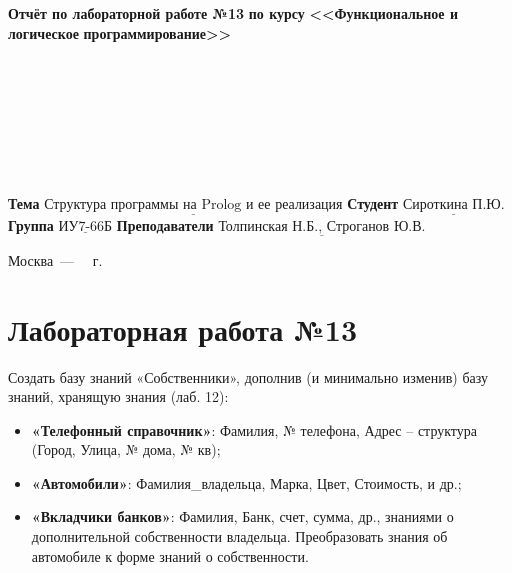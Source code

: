 \documentclass[12pt,a4paper]{scrreprt}
\begin{document}
\begin{titlepage}
	\begin{center}
		\noindent\begin{minipage}{1.3\textwidth}\centering
			\Large\textbf{  Отчёт по лабораторной работе №13}\newline
			\textbf{по курсу}\newline
			\textbf{<<Функциональное и логическое}\newline
			\textbf{\indent\indent\indent программирование>>}\newline
		\end{minipage}
	\end{center}
	
	~\\\\\\\\\\\\\\
	\normalsize
	\noindent\textbf{Тема } $\underline{\text{Структура программы на Prolog и ее реализация}}$\newline\newline
	\noindent\textbf{Студент } $\underline{\text{Сироткина П.Ю.}}$\newline\newline
	\noindent\textbf{Группа } $\underline{\text{ИУ7-66Б}}$\newline\newline
	\noindent\textbf{Преподаватели } $\underline{\text{Толпинская Н.Б., Строганов Ю.В.}}$\newline
	
	\begin{center}
		\vfill
		Москва~---~\the\year
		~г.
	\end{center}
\end{titlepage}

\chapter*{Лабораторная работа №13}

Создать базу знаний «Собственники», дополнив (и минимально изменив) базу
знаний, хранящую знания (лаб. 12):

\begin{itemize}
	\item \textbf{«Телефонный справочник»}: Фамилия, № телефона, Адрес – структура (Город,
	Улица, № дома, № кв);
	\item \textbf{«Автомобили»}: Фамилия\_владельца, Марка, Цвет, Стоимость, и др.;
	\item \textbf{«Вкладчики банков»}: Фамилия, Банк, счет, сумма, др.,
	знаниями о дополнительной собственности владельца. Преобразовать знания об
	автомобиле к форме знаний о собственности.
\end{itemize}
\end{document}
